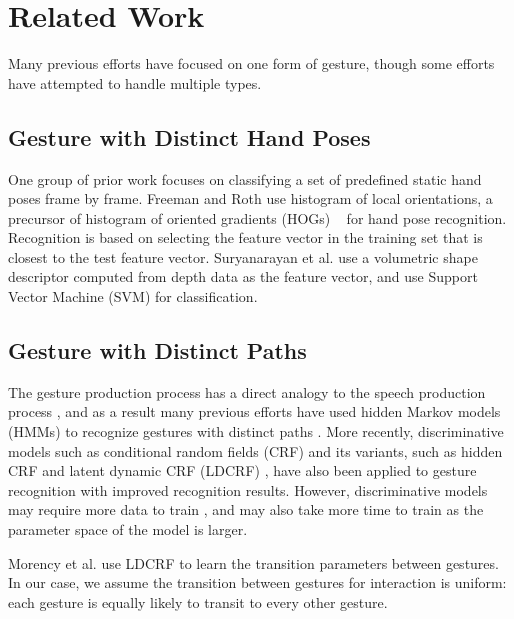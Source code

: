 \documentclass[conference]{IEEEtran}
\begin{document}
\section{Related Work}\label{sec:related}
Many previous efforts have focused on one form of
gesture, though some efforts have attempted to handle multiple types.

\subsection{Gesture with Distinct Hand Poses}
One group of prior work focuses on classifying a set of predefined static hand
poses frame by frame. Freeman and Roth \cite{freeman95} use histogram of local
orientations, a precursor of histogram of oriented gradients (HOGs)
~\cite{dalal05}
for hand pose recognition.
Recognition is based on selecting the feature vector in the training set that is closest to the test feature vector. Suryanarayan et al. \cite{suryanarayan2010} use a volumetric shape
descriptor computed from depth data as the feature vector, and use Support
Vector Machine (SVM) for classification.

\subsection{Gesture with Distinct Paths}
The gesture production process has a direct analogy to the
speech production process \cite{Kettebekov01}, and as a result many previous
efforts have used hidden Markov models (HMMs) to recognize gestures
with distinct paths \cite{Starner95, sharma00}. More recently, discriminative models such as
conditional random fields (CRF) and its variants, such as hidden CRF
\cite{wang06} and latent dynamic CRF (LDCRF) \cite{morency07}, have also been
applied to gesture recognition with improved recognition results.
However, discriminative models may require more data to train \cite{ng02},
and may also take more time to train as the parameter space of the model is
larger.

Morency et al. \cite{morency07} use LDCRF to learn the transition parameters
between gestures. In our case, we assume the transition between gestures for
interaction is uniform: each gesture is equally likely to transit to every
other gesture.
\end{document}
